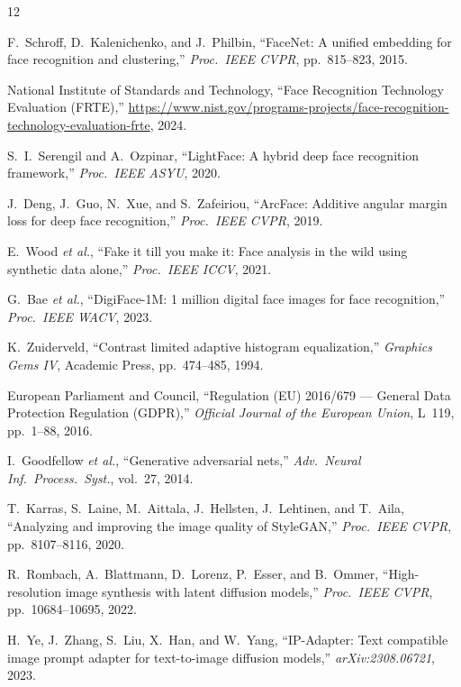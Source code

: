 \documentclass[conference]{IEEEtran}
\begin{document}
\begin{thebibliography}{12}

F.~Schroff, D.~Kalenichenko, and J.~Philbin,
``FaceNet: A unified embedding for face recognition and clustering,''
\textit{Proc.\ IEEE CVPR}, pp.\ 815--823, 2015.

National Institute of Standards and Technology,
``Face Recognition Technology Evaluation (FRTE),''
\url{https://www.nist.gov/programs-projects/face-recognition-technology-evaluation-frte},
2024.

S.~I.~Serengil and A.~Ozpinar,
``LightFace: A hybrid deep face recognition framework,''
\textit{Proc.\ IEEE ASYU}, 2020.

J.~Deng, J.~Guo, N.~Xue, and S.~Zafeiriou,
``ArcFace: Additive angular margin loss for deep face recognition,''
\textit{Proc.\ IEEE CVPR}, 2019.

E.~Wood \textit{et al.},
``Fake it till you make it: Face analysis in the wild using synthetic data alone,''
\textit{Proc.\ IEEE ICCV}, 2021.

G.~Bae \textit{et al.},
``DigiFace-1M: 1 million digital face images for face recognition,''
\textit{Proc.\ IEEE WACV}, 2023.

K.~Zuiderveld,
``Contrast limited adaptive histogram equalization,''
\textit{Graphics Gems IV}, Academic Press, pp.\ 474--485, 1994.

European Parliament and Council,
``Regulation (EU) 2016/679 --- General Data Protection Regulation (GDPR),''
\textit{Official Journal of the European Union}, L~119, pp.\ 1--88, 2016.

I.~Goodfellow \textit{et al.},
``Generative adversarial nets,''
\textit{Adv.\ Neural Inf.\ Process.\ Syst.}, vol.~27, 2014.

T.~Karras, S.~Laine, M.~Aittala, J.~Hellsten, J.~Lehtinen, and T.~Aila,
``Analyzing and improving the image quality of StyleGAN,''
\textit{Proc.\ IEEE CVPR}, pp.\ 8107--8116, 2020.

R.~Rombach, A.~Blattmann, D.~Lorenz, P.~Esser, and B.~Ommer,
``High-resolution image synthesis with latent diffusion models,''
\textit{Proc.\ IEEE CVPR}, pp.\ 10684--10695, 2022.

H.~Ye, J.~Zhang, S.~Liu, X.~Han, and W.~Yang,
``IP-Adapter: Text compatible image prompt adapter for text-to-image diffusion models,''
\textit{arXiv:2308.06721}, 2023.

\end{thebibliography}
\end{document}
